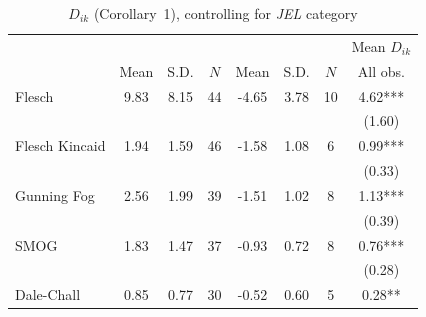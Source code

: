 \begin{table}[H]
    \footnotesize
    \centering
    \begin{threeparttable}
        \caption{\(D_{ik}\) (Corollary~1), controlling for \textit{JEL} category}
        \label{table8_jel}
        \begin{tabular}{p{3cm}S[table-format=3.3]@{}S[table-format=3.3]@{}S[table-format=3.2]@{}S[table-format=4.3]@{}S[table-format=3.3]@{}S[table-format=3.1]@{}S@{}}
            \toprule
            &&&{{Mean \(D_{ik}\)}}\\\cmidrule(lr){2-4}\cmidrule(lr){5-7}\cmidrule(lr){8-8}&{{Mean}}&{{S.D.}}&{{\(N\)}}&{{Mean}}&{{S.D.}}&{{\(N\)}}&{{All obs.}}\\
            \midrule
            Flesch                        &        9.83&        8.15&          44&       -4.65&        3.78&          10&        4.62***\\
                                          &            &            &            &            &            &            &      (1.60)   \\
            Flesch Kincaid                &        1.94&        1.59&          46&       -1.58&        1.08&           6&        0.99***\\
                                          &            &            &            &            &            &            &      (0.33)   \\
            Gunning Fog                   &        2.56&        1.99&          39&       -1.51&        1.02&           8&        1.13***\\
                                          &            &            &            &            &            &            &      (0.39)   \\
            SMOG                          &        1.83&        1.47&          37&       -0.93&        0.72&           8&        0.76***\\
                                          &            &            &            &            &            &            &      (0.28)   \\
            Dale-Chall                    &        0.85&        0.77&          30&       -0.52&        0.60&           5&        0.28** \\

\end{tabular}
\end{threeparttable}
\end{table}
